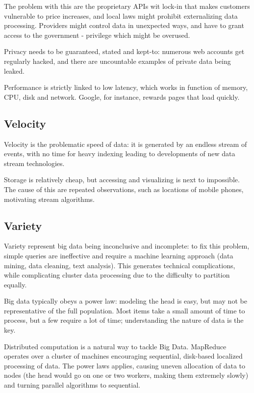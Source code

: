 The problem with this are the proprietary APIs wit lock-in that makes customers vulnerable to price increases, and local laws might prohibit externalizing data processing. Providers might control data in unexpected ways, and have to grant access to the government - privilege which might be overused.

Privacy needs to be guaranteed, stated and kept-to: numerous web accounts get regularly hacked, and there are uncountable examples of private data being leaked. 

Performance is strictly linked to low latency, which works in function of memory, CPU, disk and network. Google, for instance, rewards pages that load quickly. 

\subsection{Velocity}
Velocity is the problematic speed of data: it is generated by an endless stream of events, with no time for heavy indexing leading to developments of new data stream technologies. 

Storage is relatively cheap, but accessing and visualizing is next to impossible. The cause of this are repeated observations, such as locations of mobile phones, motivating stream algorithms. 

\subsection{Variety}
Variety represent big data being inconclusive and incomplete: to fix this problem, simple queries are ineffective and require a machine learning approach (data mining, data cleaning, text analysis). This generates technical complications, while complicating cluster data processing due to the difficulty to partition equally.

Big data typically obeys a power law: modeling the head is easy, but may not be representative of the full population. Most items take a small amount of time to process, but a few require a lot of time; understanding the nature of data is the key. 

Distributed computation is a natural way to tackle Big Data. MapReduce operates over a cluster of machines encouraging sequential, disk-based localized processing of data. The power laws applies, causing uneven allocation of data to nodes (the head would go on one or two workers, making them extremely slowly) and turning parallel algorithms to sequential. 

